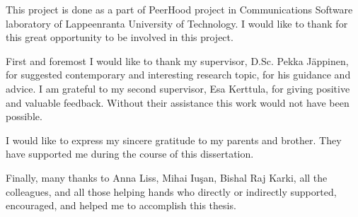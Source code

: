 %
%
This project is done as a part of PeerHood project in Communications Software laboratory of Lappeenranta University of Technology.
%
I would like to thank for this great opportunity to be involved in this project.

%
First and foremost I would like to thank my supervisor, D.Sc. Pekka J\"appinen, for suggested contemporary and interesting research topic, for his guidance and advice. 
%
I am grateful to my second supervisor, Esa Kerttula, for giving positive and valuable feedback. 
%
Without their assistance this work would not have been possible.

%
I would like to express my sincere gratitude to my parents and brother.
%
They have supported me during the course of this dissertation.

%
Finally, many thanks to Anna Liss, 
Mihai Iu\c{s}an, Bishal Raj Karki, all the colleagues, and all those helping hands who directly or indirectly supported, encouraged, and helped me to accomplish this thesis.